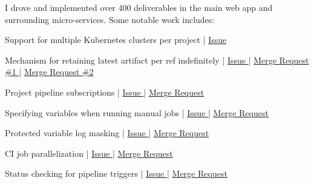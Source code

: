 \documentclass[]{matija-resume}
\begin{document}
\begin{minipage}[t]{1.0\textwidth}
\vspace{\topsep}
I drove and implemented over 400 deliverables in the main web app and surrounding micro-services. Some notable work includes:
\vspace{\topsep}
\begin{tightemize}
\item Support for multiple Kubernetes clusters per project | \href{https://gitlab.com/gitlab-org/gitlab/-/issues/3734}{Issue }
\item Mechanism for retaining latest artifact per ref indefinitely | \href{https://gitlab.com/gitlab-org/gitlab/-/issues/16267}{Issue } | \href{https://gitlab.com/gitlab-org/gitlab/-/merge_requests/29802}{Merge Request \#1 } | \href{https://gitlab.com/gitlab-org/gitlab/-/merge_requests/30741}{Merge Request \#2 }
\item Project pipeline subscriptions | \href{https://gitlab.com/gitlab-org/gitlab/-/issues/9045}{Issue } | \href{https://gitlab.com/gitlab-org/gitlab/-/merge_requests/20063}{Merge Request }
\item Specifying variables when running manual jobs | \href{https://gitlab.com/gitlab-org/gitlab-foss/-/issues/24935}{Issue } | \href{https://gitlab.com/gitlab-org/gitlab-foss/-/merge_requests/30485}{Merge Request }
\item Protected variable log masking | \href{https://gitlab.com/gitlab-org/gitlab-foss/-/issues/13784}{Issue } | \href{hhttps://gitlab.com/gitlab-org/gitlab-foss/-/merge_requests/25293}{Merge Request }
\item CI job parallelization | \href{https://gitlab.com/gitlab-org/gitlab-foss/-/issues/21480}{Issue } | \href{https://gitlab.com/gitlab-org/gitlab-foss/-/merge_requests/22631}{Merge Request }
\item Status checking for pipeline triggers | \href{https://gitlab.com/gitlab-org/gitlab/-/issues/11238}{Issue } | \href{https://gitlab.com/gitlab-org/gitlab/-/merge_requests/15580}{Merge Request }
\end{tightemize}
\sectionsep

\end{minipage}
\end{document}
